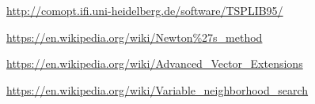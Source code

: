 \documentclass[a4paper]{report}
\begin{document}








\begin{thebibliography}{9}
	\url{http://comopt.ifi.uni-heidelberg.de/software/TSPLIB95/}

	\url{https://en.wikipedia.org/wiki/Newton%27s_method}

	\url{https://en.wikipedia.org/wiki/Advanced_Vector_Extensions}

	\url{https://en.wikipedia.org/wiki/Variable_neighborhood_search}

\end{thebibliography}
\end{document}
